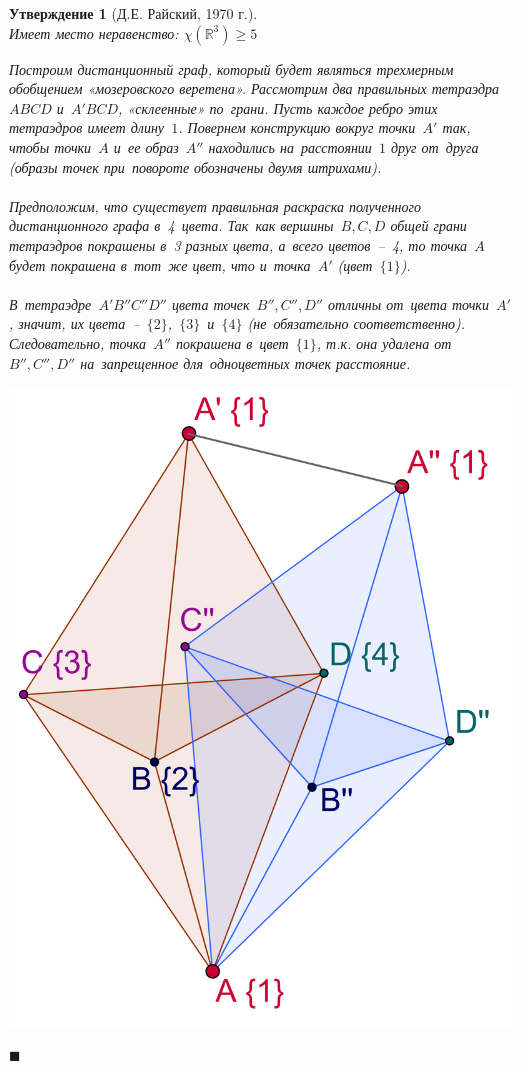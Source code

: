 \documentclass{report}%
\newtheorem{claim}{Утверждение}
\newenvironment{proof}{\par\noindent{\bf Доказательство.}}{\hfill$\scriptstyle\blacksquare$}
\begin{document}
\begin{claim}[Д.Е. Райский, 1970 г.]~\\
		Имеет место неравенство: $\chi(\mathbb{R}^3) \geq 5$ \\
		\begin{proof}
				Построим дистанционный граф, который будет являться трехмерным обобщением «мозеровского веретена». 
				Рассмотрим два правильных тетраэдра $ABCD$ и~$A'BCD$, «склеенные» по~грани.
				Пусть каждое ребро этих тетраэдров имеет длину~$1$. Повернем конструкцию вокруг точки~$A'$ так,
				чтобы точки~$A$ и~ее образ~$A''$ находились на~расстоянии~$1$ друг от~друга
				(образы точек при~повороте обозначены двумя штрихами). \\\\Предположим, что существует
				правильная раскраска полученного дистанционного графа в~4~цвета. Так~как вершины~$B, C, D$
				общей грани тетраэдров покрашены в~3 разных цвета, а~всего цветов~–~4,
				то точка~$A$ будет покрашена в~тот~же цвет, что и~точка~$A'$ (цвет~$\{1\}$).\\\\
				В~тетраэдре~$A'B''C''D''$ цвета точек~$B'', C'', D''$ отличны от~цвета точки~$A'$,
				значит, их цвета~–~$\{2\}$,~$\{3\}$~и~$\{4\}$ (не~обязательно соответственно).
				Следовательно, точка~$A''$ покрашена в~цвет~$\{1\}$, т.к. она удалена от~$B'',C'',D''$
				на~запрещенное для~одноцветных точек расстояние. \\
			\begin{center}
					\includegraphics[scale = 0.23]{raisky}
			\end{center}
			

\end{proof}
\end{claim}
\end{document}
